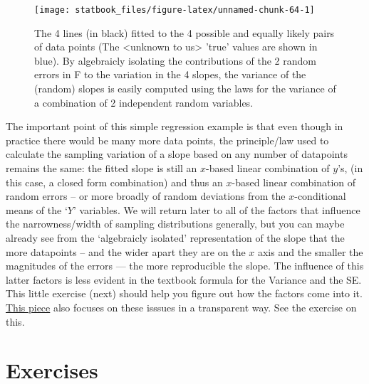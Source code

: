 \documentclass[]{book}
\begin{document}
\begin{figure}

{\centering \texttt{[image: statbook\_files/figure-latex/unnamed-chunk-64-1]} 

}

\caption{The 4  lines (in black) fitted to the 4 possible and equally likely pairs of data points (The  <unknown to us> 'true' values are shown in blue). By algebraicly isolating the contributions of the 2 random errors in F to the variation in the 4 slopes, the variance of the (random) slopes is easily computed using the laws for the variance of a combination of 2 independent random variables.}\label{fig:unnamed-chunk-64}
\end{figure}

The important point of this simple regression example is that even though in practice there would be many more data points, the principle/law used to calculate the sampling variation of a slope based on any number of datapoints remains the same: the fitted slope is still an \(x\)-based linear combination of \(y\)'s, (in this case, a closed form combination) and thus an \(x\)-based linear combination of random errors -- or more broadly of random deviations from the \(x\)-conditional means of the `\(Y\)' variables. We will return later to all of the factors that influence the narrowness/width of sampling distributions generally, but you can maybe already see from the `algebraicly isolated' representation of the slope that the more datapoints -- and the wider apart they are on the \(x\) axis and the smaller the magnitudes of the errors --- the more reproducible the slope. The influence of this latter factors is less evident in the textbook formula for the Variance and the SE. This little exercise (next) should help you figure out how the factors come into it. \href{http://www.medicine.mcgill.ca/epidemiology/hanley/Reprints/UniversalSampleSize.pdf}{This piece} also focuses on these isssues in a transparent way. See the exercise on this.

\hypertarget{exercises-2}{%
\section{Exercises}\label{exercises-2}}
\end{document}
